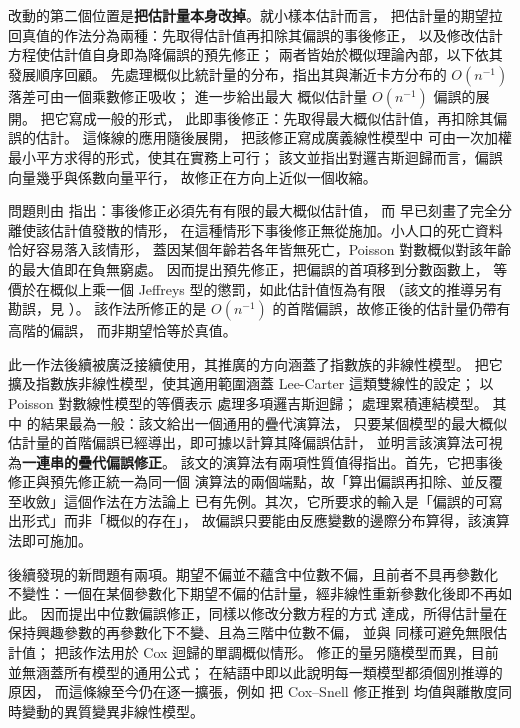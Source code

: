 改動的第二個位置是\textbf{把估計量本身改掉}。就小樣本估計而言，
把估計量的期望拉回真值的作法分為兩種：先取得估計值再扣除其偏誤的事後修正，
以及修改估計方程使估計值自身即為降偏誤的預先修正；
兩者皆始於概似理論內部，以下依其發展順序回顧。
\citet{bartlett1937} 先處理概似比統計量的分布，指出其與漸近卡方分布的
$O(n^{-1})$ 落差可由一個乘數修正吸收；\citet{bartlett1953} 進一步給出最大
概似估計量 $O(n^{-1})$ 偏誤的展開。\citet{coxsnell1968} 把它寫成一般的形式，
此即事後修正：先取得最大概似估計值，再扣除其偏誤的估計。
這條線的應用隨後展開，\citet{cordeiro1991} 把該修正寫成廣義線性模型中
可由一次加權最小平方求得的形式，使其在實務上可行；
該文並指出對邏吉斯迴歸而言，偏誤向量幾乎與係數向量平行，
故修正在方向上近似一個收縮。

問題則由 \citet{firth1993} 指出：事後修正必須先有有限的最大概似估計值，
而 \citet{albert1984} 早已刻畫了完全分離使該估計值發散的情形，
在這種情形下事後修正無從施加。小人口的死亡資料恰好容易落入該情形，
蓋因某個年齡若各年皆無死亡，Poisson 對數概似對該年齡的最大值即在負無窮處。
\citet{firth1993} 因而提出預先修正，把偏誤的首項移到分數函數上，
等價於在概似上乘一個 Jeffreys 型的懲罰，如此估計值恆為有限
（該文的推導另有勘誤，見 \citealp{firth1995}）。
該作法所修正的是 $O(n^{-1})$ 的首階偏誤，故修正後的估計量仍帶有高階的偏誤，
而非期望恰等於真值。

此一作法後續被廣泛接續使用，其推廣的方向涵蓋了指數族的非線性模型。
\citet{kosmidis2009} 把它擴及指數族非線性模型，使其適用範圍涵蓋 Lee-Carter
這類雙線性的設定；\citet{kosmidis2011} 以 Poisson 對數線性模型的等價表示
處理多項邏吉斯迴歸；\citet{kosmidis2014} 處理累積連結模型。
其中 \citet{kosmidis2010} 的結果最為一般：該文給出一個通用的疊代演算法，
只要某個模型的最大概似估計量的首階偏誤已經導出，即可據以計算其降偏誤估計，
並明言該演算法可視為\textbf{一連串的疊代偏誤修正}。
該文的演算法有兩項性質值得指出。首先，它把事後修正與預先修正統一為同一個
演算法的兩個端點，故「算出偏誤再扣除、並反覆至收斂」這個作法在方法論上
已有先例。其次，它所要求的輸入是「偏誤的可寫出形式」而非「概似的存在」，
故偏誤只要能由反應變數的邊際分布算得，該演算法即可施加。

後續發現的新問題有兩項。期望不偏並不蘊含中位數不偏，且前者不具再參數化
不變性：一個在某個參數化下期望不偏的估計量，經非線性重新參數化後即不再如此。
\citet{kennepagui2017} 因而提出中位數偏誤修正，同樣以修改分數方程的方式
達成，所得估計量在保持興趣參數的再參數化下不變、且為三階中位數不偏，
並與 \citet{firth1993} 同樣可避免無限估計值；
\citet{kennepagui2020} 把該作法用於 Cox 迴歸的單調概似情形。
修正的量另隨模型而異，目前並無涵蓋所有模型的通用公式；
\citet{cordeiro1991} 在結語中即以此說明每一類模型都須個別推導的原因，
而這條線至今仍在逐一擴張，例如 \citet{sossa2026} 把 Cox--Snell 修正推到
均值與離散度同時變動的異質變異非線性模型。

